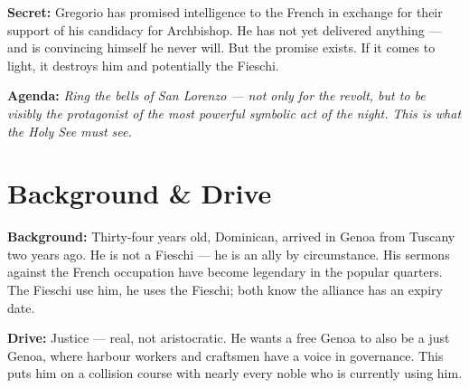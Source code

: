 \clearpage
\begin{secretbox}
\textbf{Secret:} Gregorio has promised intelligence to the French in exchange for
their support of his candidacy for Archbishop. He has not yet delivered anything ---
and is convincing himself he never will. But the promise exists. If it comes to
light, it destroys him and potentially the Fieschi.

\medskip\noindent\textcolor{SecretRed}{\textbf{Agenda:}} \textit{Ring the bells of
San Lorenzo --- not only for the revolt, but to be visibly the protagonist of the
most powerful symbolic act of the night. This is what the Holy See must see.}
\end{secretbox}

\clearpage


\section*{Background \& Drive}
\begin{rulebox}{}
\textbf{Background:} Thirty-four years old, Dominican, arrived in Genoa from Tuscany
two years ago. He is not a Fieschi --- he is an ally by circumstance. His sermons
against the French occupation have become legendary in the popular quarters. The
Fieschi use him, he uses the Fieschi; both know the alliance has an expiry date.

\medskip\noindent\textcolor{FieschiGreen}{\textbf{Drive:}} Justice --- real, not
aristocratic. He wants a free Genoa to also be a just Genoa, where harbour workers
and craftsmen have a voice in governance. This puts him on a collision course with
nearly every noble who is currently using him.
\end{rulebox}

